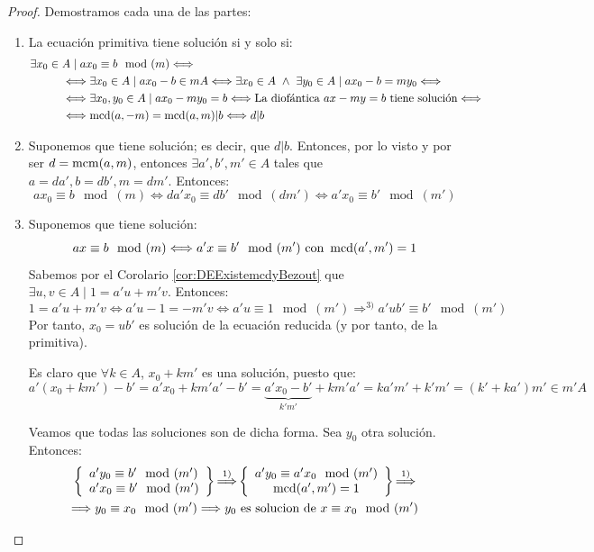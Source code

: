 \begin{proof} Demostramos cada una de las partes:
\begin{enumerate}
    \item La ecuación primitiva tiene solución si y solo si:
    \begin{align*}
        & \exists x_0 \in A \mid ax_0 \equiv b\mod(m) \Longleftrightarrow \\
        &\hspace{1cm} \Longleftrightarrow \exists x_0 \in A \mid ax_0 -b\in mA \Longleftrightarrow \exists x_0 \in A \ \land \  \exists y_0 \in A \mid ax_0 -b = my_0 \Longleftrightarrow \\
        &\hspace{1cm} \Longleftrightarrow \exists x_0, y_0 \in A \mid ax_0 - my_0 = b \Longleftrightarrow \text{La diofántica } ax-my=b \text{ tiene solución} \Longleftrightarrow \\
        &\hspace{1cm} \Longleftrightarrow \operatorname{mcd}(a,-m) = \operatorname{mcd}(a,m)|b \Longleftrightarrow d|b
    \end{align*}

    \item Suponemos que tiene solución; es decir, que $d|b$. Entonces, por lo visto y por ser $d=\operatorname{mcm}(a,m)$, entonces $\exists a',b',m' \in A$ tales que $a=da', b=db', m=dm'$. Entonces:
    $$ax_0 \equiv b\mod(m) \Longleftrightarrow da'x_0 \equiv db'\mod(dm') \Longleftrightarrow a'x_0 \equiv b'\mod(m')$$

    \item Suponemos que tiene solución:
    $$ax\equiv b\mod(m) \Longleftrightarrow a'x\equiv b'\mod(m') \text{ con } \operatorname{mcd}(a',m')=1$$
    Sabemos por el Corolario \ref{cor:DEExistemcdyBezout} que $\exists u,v \in A \mid 1=a'u+m'v $. Entonces:
    $$1=a'u+m'v \Longleftrightarrow a'u-1=-m'v \Longleftrightarrow a'u\equiv 1\mod(m') \mathop{\Longrightarrow}^{3)}
        a'ub' \equiv b'\mod(m')$$
    Por tanto, $x_0 = ub'$ es solución de la ecuación reducida (y por tanto, de la primitiva).

    
    Es claro que $\forall k \in A$, $x_0+km'$ es una solución, puesto que:
    $$a'(x_0+km')-b' = a'x_0 + km'a' -b' = \underbrace{a'x_0-b'}_{k'm'}+km'a' = ka'm'+k'm' = (k'+ka')m'\in m'A$$

    Veamos que todas las soluciones son de dicha forma. Sea $y_0$ otra solución. Entonces:
    \begin{multline*}
        \left\{ \begin{array}{l}
            a'y_0 \equiv b'\mod(m') \\
            a'x_0 \equiv b'\mod(m')
        \end{array} \right\} \mathop{\Longrightarrow}^{1)} \left\{ \begin{array}{c}
            a'y_0 \equiv a'x_0 \mod(m') \\
            \operatorname{mcd}(a',m')=1
        \end{array} \right\} \mathop{\Longrightarrow}^{1)} \\
        \Longrightarrow y_0\equiv x_0\mod(m') \Longrightarrow y_0 \text{ es solucion de } x\equiv x_0\mod(m')
    \end{multline*}


\end{enumerate}
\end{proof}
